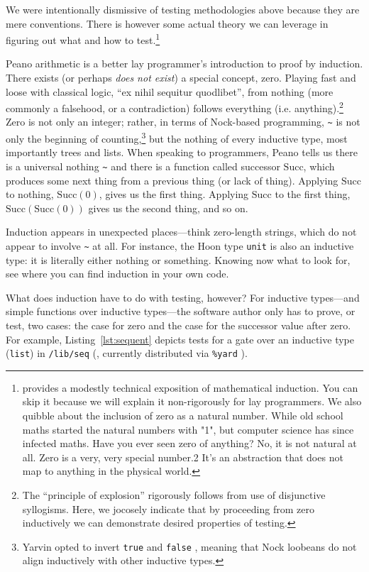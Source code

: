 \documentclass[twoside]{article}
\begin{document}
We were intentionally dismissive of testing methodologies above because they are mere conventions. There is however some actual theory we can leverage in figuring out what and how to test.\footnote{\citet{WikipediaInduction} provides a modestly technical exposition of mathematical induction. You can skip it because we will explain it non-rigorously for lay programmers. We also quibble about the inclusion of zero as a natural number. While old school maths started the natural numbers with "1", but computer science has since infected maths. Have you ever seen zero of anything? No, it is not natural at all. Zero is a very, very special number.2 It's an abstraction that does not map to anything in the physical world.}

Peano arithmetic is a better lay programmer's introduction to proof by induction. There exists (or perhaps \emph{does not exist}) a special concept, zero. Playing fast and loose with classical logic, “ex nihil sequitur quodlibet”, from nothing (more commonly a falsehood, or a contradiction) follows everything (i.e. anything).\footnote{The “principle of explosion” rigorously follows from use of disjunctive syllogisms.  Here, we jocosely indicate that by proceeding from zero inductively we can demonstrate desired properties of testing.} Zero is not only an integer; rather, in terms of Nock-based programming, \lstinline[style=inlinecode]{~} is not only the beginning of counting,\footnote{Yarvin opted to invert \texttt{true} and \texttt{false} \citep{Yarvin2006}, meaning that Nock loobeans do not align inductively with other inductive types.} but the nothing of every inductive type, most importantly trees and lists. When speaking to programmers, Peano tells us there is a universal nothing \lstinline[style=inlinecode]{~} and there is a function called successor $\textrm{Succ}$, which produces some next thing from a previous thing (or lack of thing). Applying $\textrm{Succ}$ to nothing, $\textrm{Succ}(0)$, gives us the first thing.  Applying $\textrm{Succ}$ to the first thing, $\textrm{Succ}(\textrm{Succ}(0))$ gives us the second thing, and so on.

Induction appears in unexpected places—think zero-length strings, which do not appear to involve \lstinline[style=inlinecode]{~} at all. For instance, the Hoon type \texttt{unit} is also an inductive type: it is literally either nothing or something. Knowing now what to look for, see where you can find induction in your own code.

What does induction have to do with testing, however?  For inductive types—and simple functions over inductive types—the software author only has to prove, or test, two cases:  the case for zero and the case for the successor value after zero.  For example, Listing~\ref{lst:sequent} depicts tests for a gate over an inductive type (\texttt{list}) in \texttt{/lib/seq} (\citet{FoxSequent}, currently distributed via \texttt{\%yard} \citep{UrbitYard}).
\end{document}
